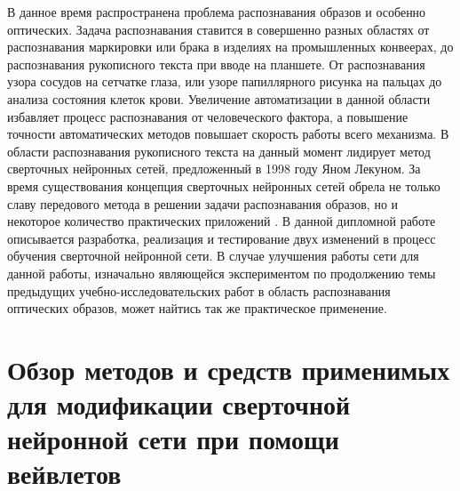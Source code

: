 \documentclass[utf8,usehyperref,14pt]{G7-32}
\begin{document}

\frontmatter %



 \tableofcontents


\Introduction
В данное время распространена проблема распознавания образов и особенно оптических. Задача распознавания ставится в совершенно разных областях от распознавания маркировки или брака в изделиях на промышленных конвеерах, до распознавания рукописного текста при вводе на планшете. От распознавания узора сосудов на сетчатке глаза, или узоре папиллярного рисунка на пальцах до анализа состояния клеток крови. Увеличение автоматизации в данной области избавляет процесс распознавания от человеческого фактора, а повышение точности автоматических методов повышает скорость работы всего механизма. В области распознавания рукописного текста на данный момент лидирует метод сверточных нейронных сетей, предложенный в 1998 году Яном Лекуном. За время существования концепция сверточных нейронных сетей обрела не только славу передового метода в решении задачи распознавания образов, но и некоторое количество практических приложений \cite{microsoft_paper}. В данной дипломной работе описывается разработка, реализация и тестирование двух изменений в процесс обучения сверточной нейронной сети. В случае улучшения работы сети для данной работы, изначально являющейся экспериментом по продолжению темы предыдущих учебно-исследовательских работ в область распознавания оптических образов, может найтись так же практическое применение.

\mainmatter %
\chapter{Обзор методов и средств применимых для модификации сверточной нейронной сети при помощи вейвлетов}
\end{document}
